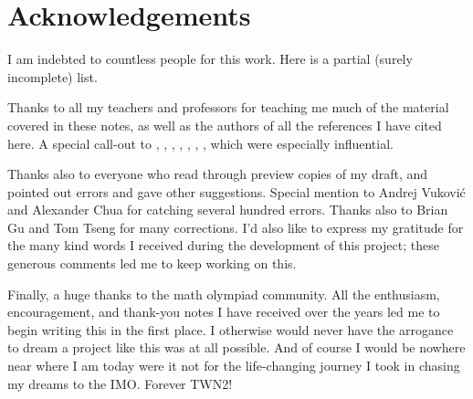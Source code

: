 \section*{Acknowledgements}
I am indebted to countless people for this work.
Here is a partial (surely incomplete) list.

Thanks to all my teachers and professors for teaching me much of the
material covered in these notes,
as well as the authors of all the references I have cited here.
A special call-out to \cite{ref:55a}, \cite{ref:msci},
\cite{ref:manifolds}, \cite{ref:gathmann}, \cite{ref:18-435},
\cite{ref:etingof}, \cite{ref:145a}, which were especially influential.

Thanks also to everyone who read through preview copies of my draft,
and pointed out errors and gave other suggestions.
Special mention to Andrej Vukovi\'c and Alexander Chua for catching several hundred errors.
Thanks also to Brian Gu and Tom Tseng for many corrections.
I'd also like to express my gratitude for the many kind words I received
during the development of this project;
these generous comments led me to keep working on this.

Finally, a huge thanks to the math olympiad community.
All the enthusiasm, encouragement, and thank-you notes I have received
over the years led me to begin writing this in the first place.
I otherwise would never have the arrogance to dream a project like this
was at all possible.
And of course I would be nowhere near where I am today were it not for the
life-changing journey I took in chasing my dreams to the IMO.
Forever TWN2!
